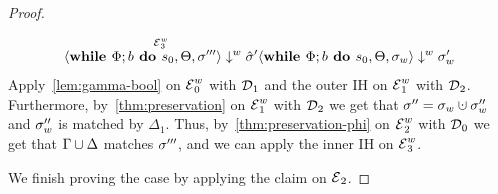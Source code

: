 \begin{proof}
\begin{claimproof}
\begin{align*}
{            \overset{\operatorname{\mathcal{E}}^w_3}{\langle \textbf{while }\Phi;{b} \textbf{ do } {s_0}, \Theta, \sigma''' \rangle \downarrow^w \hat{\sigma}'}}
            {\langle \textbf{while }\Phi;{b} \textbf{ do } {s_0}, \Theta, \sigma_w \rangle \downarrow^w \sigma_w'}
        \end{align*}
        Apply~\autoref{lem:gamma-bool} on $\operatorname{\mathcal{E}}_0^w$ with $\operatorname{\mathcal{D}}_1$
        and the outer IH on $\operatorname{\mathcal{E}}^w_1$ with $\operatorname{\mathcal{D}}_2$.
        Furthermore, by~\autoref{thm:preservation} on $\operatorname{\mathcal{E}}^w_1$ with $\operatorname{\mathcal{D}}_2$ we get that 
        $\store'' = \store_w \dunion \store''_w$ and $\sigma''_w$ is matched by $\Delta_1$.
        Thus, by~\autoref{thm:preservation-phi} on $\operatorname{\mathcal{E}}_2^w$ with $\operatorname{\mathcal{D}}_0$ we get that $\Gamma \cup \Delta$
        matches $\sigma'''$, and we can apply the inner IH on $\operatorname{\mathcal{E}}^w_3$.
    \end{claimproof}
    We finish proving the case by applying the claim on $\operatorname{\mathcal{E}}_2$.
\end{proof}

